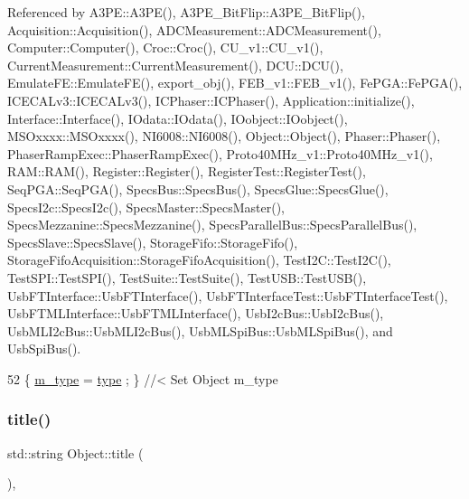 Referenced by A3\+P\+E\+::\+A3\+P\+E(), A3\+P\+E\+\_\+\+Bit\+Flip\+::\+A3\+P\+E\+\_\+\+Bit\+Flip(), Acquisition\+::\+Acquisition(), A\+D\+C\+Measurement\+::\+A\+D\+C\+Measurement(), Computer\+::\+Computer(), Croc\+::\+Croc(), C\+U\+\_\+v1\+::\+C\+U\+\_\+v1(), Current\+Measurement\+::\+Current\+Measurement(), D\+C\+U\+::\+D\+C\+U(), Emulate\+F\+E\+::\+Emulate\+F\+E(), export\+\_\+obj(), F\+E\+B\+\_\+v1\+::\+F\+E\+B\+\_\+v1(), Fe\+P\+G\+A\+::\+Fe\+P\+G\+A(), I\+C\+E\+C\+A\+Lv3\+::\+I\+C\+E\+C\+A\+Lv3(), I\+C\+Phaser\+::\+I\+C\+Phaser(), Application\+::initialize(), Interface\+::\+Interface(), I\+Odata\+::\+I\+Odata(), I\+Oobject\+::\+I\+Oobject(), M\+S\+Oxxxx\+::\+M\+S\+Oxxxx(), N\+I6008\+::\+N\+I6008(), Object\+::\+Object(), Phaser\+::\+Phaser(), Phaser\+Ramp\+Exec\+::\+Phaser\+Ramp\+Exec(), Proto40\+M\+Hz\+\_\+v1\+::\+Proto40\+M\+Hz\+\_\+v1(), R\+A\+M\+::\+R\+A\+M(), Register\+::\+Register(), Register\+Test\+::\+Register\+Test(), Seq\+P\+G\+A\+::\+Seq\+P\+G\+A(), Specs\+Bus\+::\+Specs\+Bus(), Specs\+Glue\+::\+Specs\+Glue(), Specs\+I2c\+::\+Specs\+I2c(), Specs\+Master\+::\+Specs\+Master(), Specs\+Mezzanine\+::\+Specs\+Mezzanine(), Specs\+Parallel\+Bus\+::\+Specs\+Parallel\+Bus(), Specs\+Slave\+::\+Specs\+Slave(), Storage\+Fifo\+::\+Storage\+Fifo(), Storage\+Fifo\+Acquisition\+::\+Storage\+Fifo\+Acquisition(), Test\+I2\+C\+::\+Test\+I2\+C(), Test\+S\+P\+I\+::\+Test\+S\+P\+I(), Test\+Suite\+::\+Test\+Suite(), Test\+U\+S\+B\+::\+Test\+U\+S\+B(), Usb\+F\+T\+Interface\+::\+Usb\+F\+T\+Interface(), Usb\+F\+T\+Interface\+Test\+::\+Usb\+F\+T\+Interface\+Test(), Usb\+F\+T\+M\+L\+Interface\+::\+Usb\+F\+T\+M\+L\+Interface(), Usb\+I2c\+Bus\+::\+Usb\+I2c\+Bus(), Usb\+M\+L\+I2c\+Bus\+::\+Usb\+M\+L\+I2c\+Bus(), Usb\+M\+L\+Spi\+Bus\+::\+Usb\+M\+L\+Spi\+Bus(), and Usb\+Spi\+Bus().


\begin{DoxyCode}
52 \{ \hyperlink{classObject_a457a600fe8c00eb1034374f75110a78c}{m\_type}  = \hyperlink{classObject_a84f99f70f144a83e1582d1d0f84e4e62}{type}  ; \} \textcolor{comment}{//< Set Object m\_type}
\end{DoxyCode}
\mbox{\label{classObject_a73a0f1a41828fdd8303dd662446fb6c3}} 
\subsubsection{\texorpdfstring{title()}{title()}}
{\footnotesize\ttfamily std\+::string Object\+::title (\begin{DoxyParamCaption}{ }\end{DoxyParamCaption})\hspace{0.3cm}{\ttfamily [inline]}, {\ttfamily [inherited]}}



